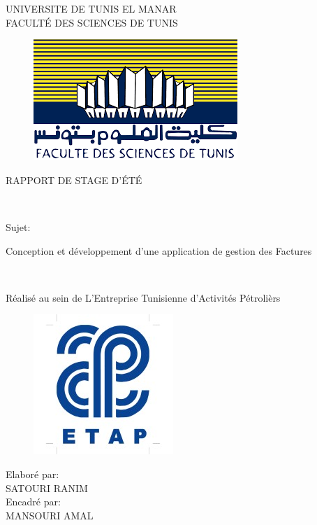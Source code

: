 \documentclass[11pt]{report}
\begin{document}
\begin{center}

UNIVERSITE DE TUNIS EL MANAR\\[15pt]
FACULTÉ DES SCIENCES DE TUNIS

\vspace{20PT}
\begin{figure}[H]
  \centering
  \includegraphics[scale=0.5]{fst}
\end{figure}
\vspace{20PT}
\begin{huge}
RAPPORT DE STAGE D'ÉTÉ
\end{huge}
\\
\vspace{30pt}
\begin{Large}
Sujet:\\
\end{Large}

\vspace{30pt}
\begin{Huge}
Conception et développement d'une application de gestion des Factures 
\end{Huge}
\\
\vspace{50pt}
\begin{Large}
Réalisé au sein de L'Entreprise Tunisienne d'Activités Pétrolièrs
\end{Large}
\end{center}
\begin{figure}[H]
  \centering
  \includegraphics[scale=0.5]{etap}
  \label{fig:votre-label}
\end{figure}
\vspace{10pt}
\begin{center}
\begin{Large}
Elaboré par:\\
\vspace{10pt}
SATOURI RANIM\\
\vspace{10pt}
Encadré par:\\
\vspace{10pt}
MANSOURI AMAL
\end{Large}

\end{center}
\end{document}

